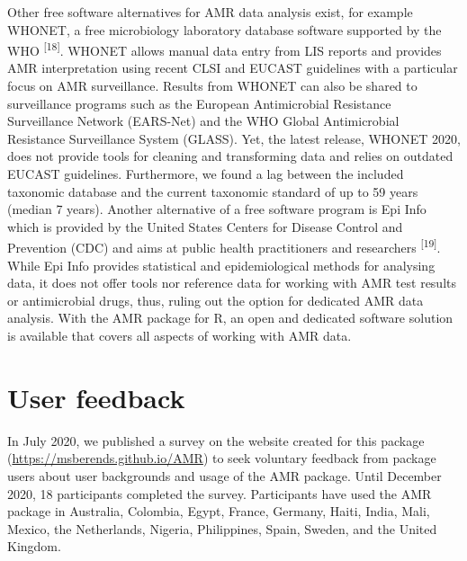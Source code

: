 \documentclass[
]{book}
\begin{document}
Other free software alternatives for AMR data analysis exist, for example WHONET, a free microbiology laboratory database software supported by the WHO \textsuperscript{{[}18{]}}. WHONET allows manual data entry from LIS reports and provides AMR interpretation using recent CLSI and EUCAST guidelines with a particular focus on AMR surveillance. Results from WHONET can also be shared to surveillance programs such as the European Antimicrobial Resistance Surveillance Network (EARS-Net) and the WHO Global Antimicrobial Resistance Surveillance System (GLASS). Yet, the latest release, WHONET 2020, does not provide tools for cleaning and transforming data and relies on outdated EUCAST guidelines. Furthermore, we found a lag between the included taxonomic database and the current taxonomic standard of up to 59 years (median 7 years). Another alternative of a free software program is Epi Info which is provided by the United States Centers for Disease Control and Prevention (CDC) and aims at public health practitioners and researchers \textsuperscript{{[}19{]}}. While Epi Info provides statistical and epidemiological methods for analysing data, it does not offer tools nor reference data for working with AMR test results or antimicrobial drugs, thus, ruling out the option for dedicated AMR data analysis. With the AMR package for R, an open and dedicated software solution is available that covers all aspects of working with AMR data.

\hypertarget{user-feedback}{%
\section{User feedback}\label{user-feedback}}

In July 2020, we published a survey on the website created for this package (\url{https://msberends.github.io/AMR}) to seek voluntary feedback from package users about user backgrounds and usage of the AMR package. Until December 2020, 18 participants completed the survey. Participants have used the AMR package in Australia, Colombia, Egypt, France, Germany, Haiti, India, Mali, Mexico, the Netherlands, Nigeria, Philippines, Spain, Sweden, and the United Kingdom.
\end{document}
